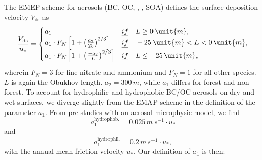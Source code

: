 \documentclass[gmd, manuscript]{copernicus}
\begin{document}
The EMEP scheme for aerosols (BC, OC, , , SOA) defines the surface deposition velocity $V_\text{ds}$ as
\begin{equation}
  \frac{V_\text{ds}}{u_*} =
  \begin{cases}
    a_1 &  \emph{if} \quad L \ge 0\,\unit{m}, \\
    a_1 \cdot F_N \left[ 1 + \left(\frac{a_2}{25}\right)^{2/3}\right] & \emph{if} \quad -25\,\unit{m} < L < 0\,\unit{m}, \\
    a_1 \cdot F_N \left[ 1 + \left(\frac{-a_2}{L}\right)^{2/3}\right] & \emph{if} \quad L \le -25\,\unit{m}, \\
  \end{cases}
\end{equation}
wherein $F_N = 3$ for fine nitrate and ammonium and $F_N = 1$ for all other species. $L$ is again the Obukhov length. $a_2 = 300\,\unit{m}$, while $a_1$ differs for forest and non-forest. To account for hydrophilic and hydrophobic BC/OC aerosols on dry and wet surfaces, we diverge slightly from the EMAP scheme in the definition of the parameter $a_1$. From pre-studies with an aerosol microphysic model, we find
\begin{equation}
  a_1^\text{hydrophob.} = 0.025\,\unit{m\,s^{-1}} \cdot \overline{u_*}
\end{equation}
and
\begin{equation} 
  a_1^\text{hydrophil.} = 0.2\,\unit{m\,s^{-1}} \cdot \overline{u_*},
\end{equation}
with the annual mean friction velocity $\overline{u_*}$. Our definition of $a_1$ is then:
\end{document}
